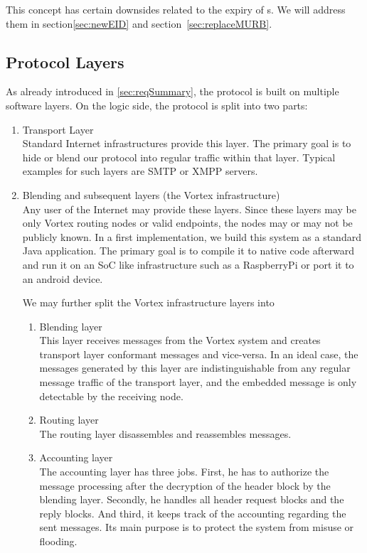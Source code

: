 This concept has certain downsides related to the expiry of s. We will address them in section\ref{sec:newEID} and section~\ref{sec:replaceMURB}.

\subsection{Protocol Layers}
As already introduced in \ref{sec:reqSummary}, the protocol is built on multiple software layers. On the logic side, the protocol is split into two parts:
\begin{enumerate}
	\item Transport Layer\\
	Standard Internet infrastructures provide this layer. The primary goal is to hide or blend our protocol into regular traffic within that layer. Typical examples for such layers are SMTP or XMPP servers.
	\item Blending and subsequent layers (the Vortex infrastructure)\\
	Any user of the Internet may provide these layers. Since these layers may be only Vortex routing nodes or valid endpoints, the nodes may or may not be publicly known. In a first implementation, we build this system as a standard Java application. The primary goal is to compile it to native code afterward and run it on an SoC like infrastructure such as a RaspberryPi or port it to an android device.
	
	We may further split the Vortex infrastructure layers into
	\begin{enumerate}
		\item Blending layer\\
		This layer receives messages from the Vortex system and creates transport layer conformant messages and vice-versa. In an ideal case, the messages generated by this layer are indistinguishable from any regular message traffic of the transport layer, and the embedded message is only detectable by the receiving node.
		\item Routing layer\\
		The routing layer disassembles and reassembles messages. 
		\item Accounting layer\\
		The accounting layer has three jobs. First, he has to authorize the message processing after the decryption of the header block by the blending layer. Secondly, he handles all header request blocks and the reply blocks. And third, it keeps track of the accounting regarding the sent messages. Its main purpose is to protect the system from misuse or flooding.    
	\end{enumerate}
\end{enumerate}

